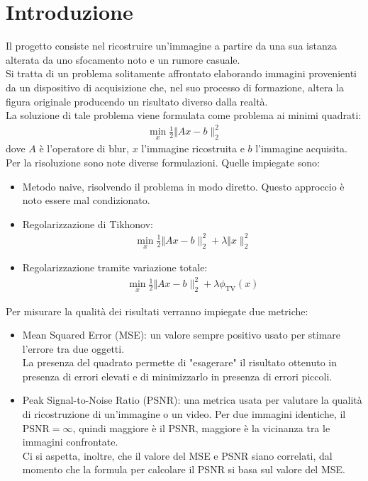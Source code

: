 \documentclass[11pt]{article}
\begin{document}
\section{Introduzione}
Il progetto consiste nel ricostruire un'immagine a partire da una sua istanza alterata da uno sfocamento noto e un rumore casuale.\\
Si tratta di un problema solitamente affrontato elaborando immagini provenienti da un dispositivo di acquisizione che, nel suo processo di formazione, altera la figura originale producendo un risultato diverso dalla realtà.\\ 
La soluzione di tale problema viene formulata come problema ai minimi quadrati:
\begin{align*}
    \min\limits_{x} \frac{1}{2} \Vert Ax-b \|_{2}^{2}
\end{align*}
dove $A$ è l'operatore di blur, $x$ l'immagine ricostruita e $b$ l'immagine acquisita.\\

Per la risoluzione sono note diverse formulazioni. Quelle impiegate sono:
\begin{itemize}
    \setlength\itemsep{0.05cm}
    \item Metodo naive, risolvendo il problema in modo diretto. Questo approccio è noto essere mal condizionato.
    \item Regolarizzazione di Tikhonov:
    \begin{align*}
    	\min\limits_{x} \frac{1}{2} \Vert Ax-b \|_{2}^{2} + \lambda \Vert x \|_{2}^{2}
    \end{align*}
    \item Regolarizzazione tramite variazione totale:
    \begin{align*}
    	\min\limits_{x} \frac{1}{2} \Vert Ax-b \|_{2}^{2} + \lambda \phi_{\text{TV}}(x)
    \end{align*}

\end{itemize}
Per misurare la qualità dei risultati verranno impiegate due metriche:
\begin{itemize}
    \setlength\itemsep{0.05cm}
    \item Mean Squared Error (MSE): un valore sempre positivo usato per stimare l'errore tra due oggetti. \\
    La presenza del quadrato permette di "esagerare" il risultato ottenuto in presenza di errori elevati e di minimizzarlo in presenza di errori piccoli.
    \item Peak Signal-to-Noise Ratio (PSNR): una metrica usata per valutare la qualità di ricostruzione di un'immagine o un video. Per due immagini identiche, il $\text{PSNR}=\infty$, quindi maggiore è il PSNR, maggiore è la vicinanza tra le immagini confrontate.\\
	Ci si aspetta, inoltre, che il valore del MSE e PSNR siano correlati, dal momento che la formula per calcolare il PSNR si basa sul valore del MSE.
\end{itemize}
\end{document}
